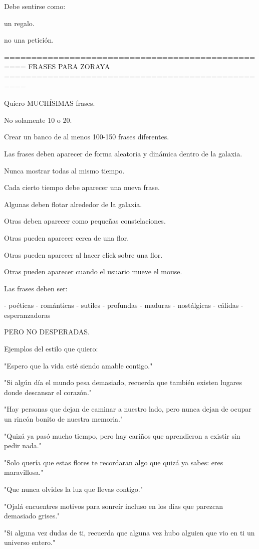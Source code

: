 Debe sentirse como:

un regalo.

no una petición.

==================================================
FRASES PARA ZORAYA
==================================================

Quiero MUCHÍSIMAS frases.

No solamente 10 o 20.

Crear un banco de al menos 100-150 frases diferentes.

Las frases deben aparecer de forma aleatoria y dinámica dentro de la galaxia.

Nunca mostrar todas al mismo tiempo.

Cada cierto tiempo debe aparecer una nueva frase.

Algunas deben flotar alrededor de la galaxia.

Otras deben aparecer como pequeñas constelaciones.

Otras pueden aparecer cerca de una flor.

Otras pueden aparecer al hacer click sobre una flor.

Otras pueden aparecer cuando el usuario mueve el mouse.

Las frases deben ser:

- poéticas
- románticas
- sutiles
- profundas
- maduras
- nostálgicas
- cálidas
- esperanzadoras

PERO NO DESPERADAS.

Ejemplos del estilo que quiero:

"Espero que la vida esté siendo amable contigo."

"Si algún día el mundo pesa demasiado, recuerda que también existen lugares donde descansar el corazón."

"Hay personas que dejan de caminar a nuestro lado, pero nunca dejan de ocupar un rincón bonito de nuestra memoria."

"Quizá ya pasó mucho tiempo, pero hay cariños que aprendieron a existir sin pedir nada."

"Solo quería que estas flores te recordaran algo que quizá ya sabes: eres maravillosa."

"Que nunca olvides la luz que llevas contigo."

"Ojalá encuentres motivos para sonreír incluso en los días que parezcan demasiado grises."

"Si alguna vez dudas de ti, recuerda que alguna vez hubo alguien que vio en ti un universo entero."

